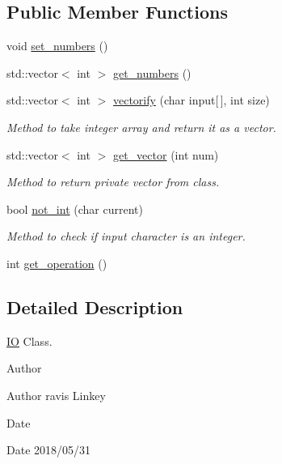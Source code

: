 \subsection*{Public Member Functions}
\begin{DoxyCompactItemize}
\item 
void \mbox{\hyperlink{classIO_a51997957fe3ae3bb8f8a72e2a41debf5}{set\+\_\+numbers}} ()
\item 
std\+::vector$<$ int $>$ \mbox{\hyperlink{classIO_a049d0bb812a8ac48b950f60f4931f344}{get\+\_\+numbers}} ()
\item 
std\+::vector$<$ int $>$ \mbox{\hyperlink{classIO_a258e39776df5a07ad72c7816ac0acdf2}{vectorify}} (char input\mbox{[}$\,$\mbox{]}, int size)
\begin{DoxyCompactList}\small\item\em Method to take integer array and return it as a vector. \end{DoxyCompactList}\item 
std\+::vector$<$ int $>$ \mbox{\hyperlink{classIO_a83820ab9aabab4a14b1a606966abe7cf}{get\+\_\+vector}} (int num)
\begin{DoxyCompactList}\small\item\em Method to return private vector from class. \end{DoxyCompactList}\item 
bool \mbox{\hyperlink{classIO_a96a29f45bb9632611271d945aeee6b2a}{not\+\_\+int}} (char current)
\begin{DoxyCompactList}\small\item\em Method to check if input character is an integer. \end{DoxyCompactList}\item 
int \mbox{\hyperlink{classIO_accf477f16d55cee9ece47ca7c8f8787c}{get\+\_\+operation}} ()
\end{DoxyCompactItemize}


\subsection{Detailed Description}
\mbox{\hyperlink{classIO}{IO}} Class. 

\begin{DoxyAuthor}{Author}

\end{DoxyAuthor}
\begin{DoxyParagraph}{Author}
ravis Linkey 
\end{DoxyParagraph}


\begin{DoxyDate}{Date}

\end{DoxyDate}
\begin{DoxyParagraph}{Date}
2018/05/31 
\end{DoxyParagraph}


